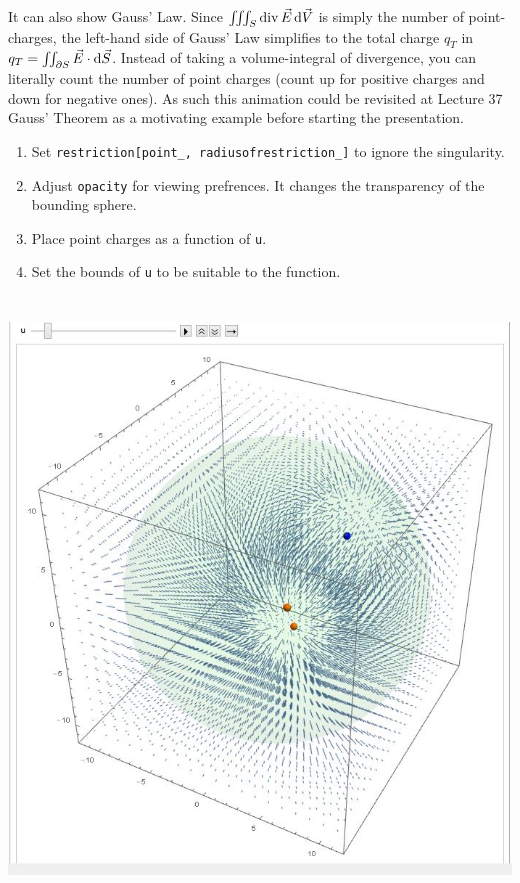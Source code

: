 It can also show Gauss' Law. Since \(\iiint_S \divf \vec E \dif \vec V\) is simply the number of point-charges, the left-hand side of Gauss' Law simplifies to the total charge \(q_T\) in \(q_T = \iint_{\partial S} \vec E \cdot \dif \vec S\). Instead of taking a volume-integral of divergence, you can literally count the number of point charges (count up for positive charges and down for negative ones). As such this animation could be revisited at Lecture 37 Gauss' Theorem as a motivating example before starting the presentation.

\begin{enumerate}
\item Set \verb+restriction[point_, radiusofrestriction_]+ to ignore the singularity.
\item Adjust \verb+opacity+ for viewing prefrences. It changes the transparency of the bounding sphere. 
\item Place point charges as a function of \verb+u+.
\item Set the bounds of \verb+u+ to be suitable to the function.
\end{enumerate}

\includegraphics[height=16cm]{../exhibit/divergence.jpg}

